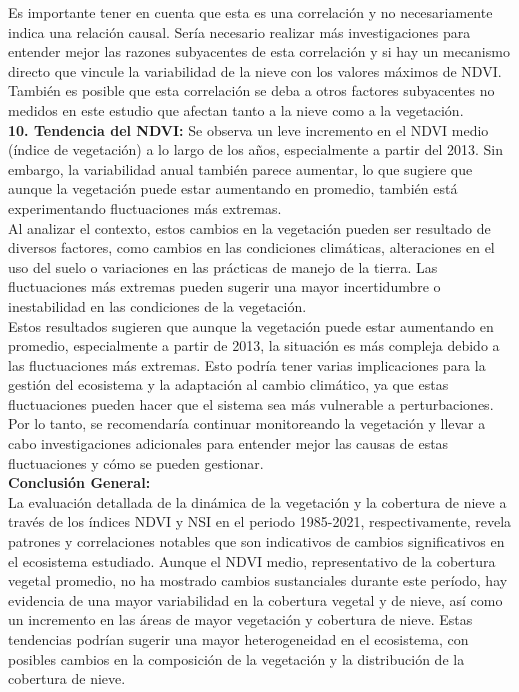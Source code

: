 {Es importante tener en cuenta que esta es una correlación y no necesariamente indica una relación causal. Sería necesario realizar más investigaciones para entender mejor las razones subyacentes de esta correlación y si hay un mecanismo directo que vincule la variabilidad de la nieve con los valores máximos de NDVI. También es posible que esta correlación se deba a otros factores subyacentes no medidos en este estudio que afectan tanto a la nieve como a la vegetación.\\

\textbf{10.	Tendencia del NDVI:} Se observa un leve incremento en el NDVI medio (índice de vegetación) a lo largo de los años, especialmente a partir del 2013. Sin embargo, la variabilidad anual también parece aumentar, lo que sugiere que aunque la vegetación puede estar aumentando en promedio, también está experimentando fluctuaciones más extremas.\\

Al analizar el contexto, estos cambios en la vegetación pueden ser resultado de diversos factores, como cambios en las condiciones climáticas, alteraciones en el uso del suelo o variaciones en las prácticas de manejo de la tierra. Las fluctuaciones más extremas pueden sugerir una mayor incertidumbre o inestabilidad en las condiciones de la vegetación.\\

Estos resultados sugieren que aunque la vegetación puede estar aumentando en promedio, especialmente a partir de 2013, la situación es más compleja debido a las fluctuaciones más extremas. Esto podría tener varias implicaciones para la gestión del ecosistema y la adaptación al cambio climático, ya que estas fluctuaciones pueden hacer que el sistema sea más vulnerable a perturbaciones. Por lo tanto, se recomendaría continuar monitoreando la vegetación y llevar a cabo investigaciones adicionales para entender mejor las causas de estas fluctuaciones y cómo se pueden gestionar.\\


\textbf{Conclusión General:}\\

La evaluación detallada de la dinámica de la vegetación y la cobertura de nieve a través de los índices NDVI y NSI en el periodo 1985-2021, respectivamente, revela patrones y correlaciones notables que son indicativos de cambios significativos en el ecosistema estudiado. Aunque el NDVI medio, representativo de la cobertura vegetal promedio, no ha mostrado cambios sustanciales durante este período, hay evidencia de una mayor variabilidad en la cobertura vegetal y de nieve, así como un incremento en las áreas de mayor vegetación y cobertura de nieve. Estas tendencias podrían sugerir una mayor heterogeneidad en el ecosistema, con posibles cambios en la composición de la vegetación y la distribución de la cobertura de nieve.\\

}
